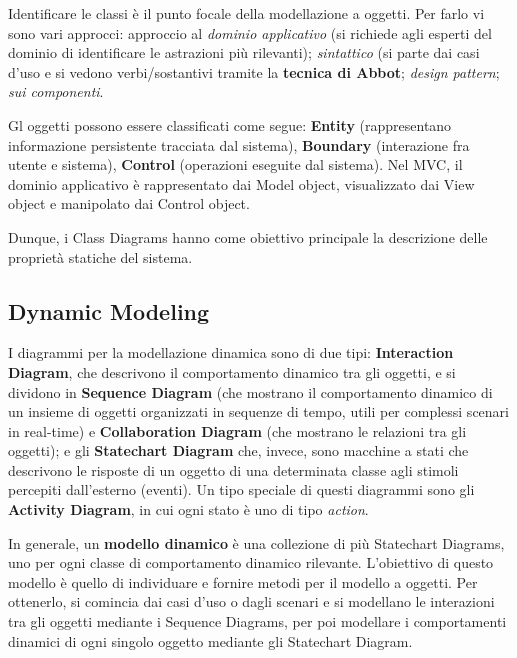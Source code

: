 \documentclass{article}
\begin{document}
        \vspace{3mm}
        
        Identificare le classi è il punto focale della modellazione a oggetti. Per farlo vi sono vari approcci: approccio al \textit{dominio applicativo} (si richiede agli esperti del dominio di identificare le astrazioni più rilevanti); \textit{sintattico} (si parte dai casi d’uso e si vedono verbi/sostantivi tramite la \textbf{tecnica di Abbot}; \textit{design pattern}; \textit{sui componenti}.
        
        \vspace{3mm}
        
        Gl oggetti possono essere classificati come segue: \textbf{Entity} (rappresentano informazione persistente tracciata dal sistema), \textbf{Boundary} (interazione fra utente e sistema), \textbf{Control} (operazioni eseguite dal sistema). Nel MVC, il dominio applicativo è rappresentato dai Model object, visualizzato dai View object e manipolato dai Control object.
        
        \vspace{3mm}
        
        Dunque, i Class Diagrams hanno come obiettivo principale la descrizione delle proprietà statiche del sistema.
    
    \subsection{Dynamic Modeling}
    
        I diagrammi per la modellazione dinamica sono di due tipi: \textbf{Interaction Diagram}, che descrivono il comportamento dinamico tra gli oggetti, e si dividono in \textbf{Sequence Diagram} (che mostrano il comportamento dinamico di un insieme di oggetti organizzati in sequenze di tempo, utili per complessi scenari in real-time) e \textbf{Collaboration Diagram} (che mostrano le relazioni tra gli oggetti); e gli \textbf{Statechart Diagram} che, invece, sono macchine a stati che descrivono le risposte di un oggetto di una determinata classe agli stimoli percepiti dall’esterno (eventi). Un tipo speciale di questi diagrammi sono gli \textbf{Activity Diagram}, in cui ogni stato è uno di tipo \textit{action}. 
        
        \vspace{3mm}
        
        In generale, un \textbf{modello dinamico} è una collezione di più Statechart Diagrams, uno per ogni classe di comportamento dinamico rilevante. L’obiettivo di questo modello è quello di individuare e fornire metodi per il modello a oggetti. Per ottenerlo, si comincia dai casi d’uso o dagli scenari e si modellano le interazioni tra gli oggetti mediante i Sequence Diagrams, per poi modellare i comportamenti dinamici di ogni singolo oggetto mediante gli Statechart Diagram.
        
\end{document}
